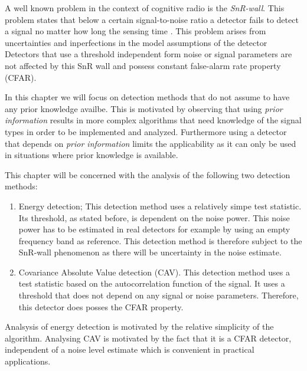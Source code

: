 \documentclass[a4paper, openany, oneside]{memoir}
\begin{document}
A well known problem in the context of cognitive radio is the \emph{SnR-wall}. This problem states that below a certain signal-to-noise ratio a detector fails to detect a signal no matter how long the sensing time \cite{sahai2009spectrum}. This problem arises from uncertainties and inperfections in the model assumptions of the detector Detectors that use a threshold independent form noise or signal parameters are not affected by this SnR wall\cite{axell2012spectrum} and possess constant false-alarm rate property (CFAR). 

In this chapter we will focus on detection methods that do not assume to have any prior knowledge availbe. This is motivated by observing that using \emph{prior information} results in more complex algorithms that need knowledge of the signal types in order to be implemented and analyzed. Furthermore using a detector that depends on \emph{prior information} limits the applicability as it can only be used in situations where prior knowledge is available. 

This chapter will be concerned with the analysis of the following two detection methods:

\begin{enumerate}
	\item Energy detection; This detection method uses a relatively simpe test statistic. Its threshold, as stated before, is dependent on 
	the noise power. This noise power has to be estimated in real detectors for example by using an empty frequency band as reference. This detection method is therefore subject to the SnR-wall phenomenon as there will be uncertainty in the noise estimate.
	\item Covariance Absolute Value detection (CAV). This detection method uses a test statistic based on the autocorrelation function of 
	the signal. It uses a threshold that does not depend on any signal or noise parameters. Therefore, this detector does posses the CFAR
	property.
\end{enumerate}

Analsysis of energy detection is motivated by the relative simplicity of  the algorithm.  Analysing CAV is motivated by the fact that it is a CFAR detector, independent of a noise level estimate which is convenient in practical applications. 
\end{document}
